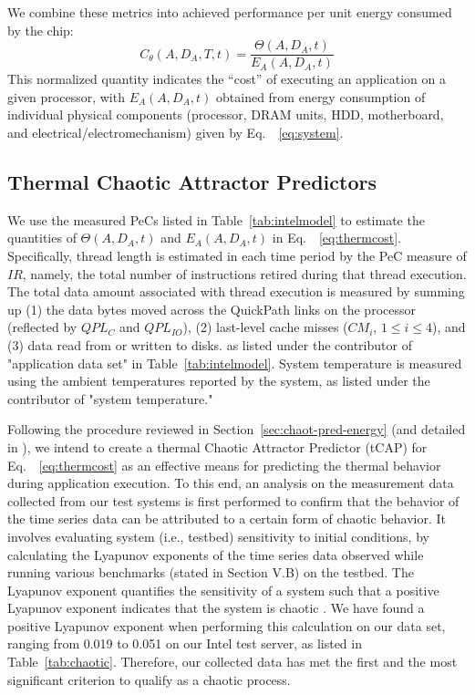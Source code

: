 \documentclass[times, 10pt,twocolumn]{IEEEtran}
\newcommand{\equationname}{Eq.\ }
\newcommand{\equationnames}{Eq.\ }
\begin{document}
We combine these metrics into achieved performance per unit energy
consumed by the chip:
\begin{equation}
\label{eq:thermcost} C_{\theta}(A, D_{A}, T, t)=\frac{\Theta (A, D_{A}, t)}{E_{A}(A, D_{A}, t)}
\end{equation}
This normalized quantity indicates the ``cost'' of executing an
application on a given processor, with $E_{A}(A, D_{A}, t)$ obtained
from energy consumption of individual physical components (processor, DRAM units, HDD, motherboard, and electrical/electromechanism) 
given by \equationname~\eqref{eq:system}.

\subsection{Thermal Chaotic Attractor Predictors}
\label{sec:therm-chaot-attr} 
We use the measured PeCs listed in Table~\ref{tab:intelmodel} to
estimate the quantities of $\Theta(A, D_{A}, t)$ and $E_{A}(A, D_{A},
t)$ in \equationname~\eqref{eq:thermcost}.  Specifically, thread length
is estimated in each time period by the PeC measure of $IR$, namely, the
total number of instructions retired during that thread execution.  The
total data amount associated with thread execution is measured by
summing up (1) the data bytes moved across the QuickPath links on the
processor (reflected by $QPL_{C}$ and $QPL_{IO}$), (2) last-level cache
misses ($CM_{i}$, $1\leq i \leq 4$), and (3) data read from or written
to disks.  as listed under the contributor of "application data set" in
Table~\ref{tab:intelmodel}.  System temperature is measured using the
ambient temperatures reported by the system, as listed under the
contributor of "system temperature."

Following the procedure reviewed in Section~\ref{sec:chaot-pred-energy}
(and detailed in \cite{Lewis2010}), we intend to create a thermal
Chaotic Attractor Predictor (tCAP) for
\equationnames~\eqref{eq:thermcost} as an effective means for predicting
the thermal behavior during application execution.  To this end, an
analysis on the measurement data collected from our test systems is
first performed to confirm that the behavior of the time series data can
be attributed to a certain form of chaotic behavior.  It involves
evaluating system (i.e., testbed) sensitivity to initial conditions, by
calculating the Lyapunov exponents of the time series data observed
while running various benchmarks (stated in Section V.B) on the testbed.
The Lyapunov exponent quantifies the sensitivity of a system such that a
positive Lyapunov exponent indicates that the system is chaotic
\cite{Sprott2003}.  We have found a positive Lyapunov exponent when
performing this calculation on our data set, ranging from 0.019 to 0.051
on our Intel test server, as listed in Table~\ref{tab:chaotic}.
Therefore, our collected data has met the first and the most significant
criterion to qualify as a chaotic process.
\end{document}
